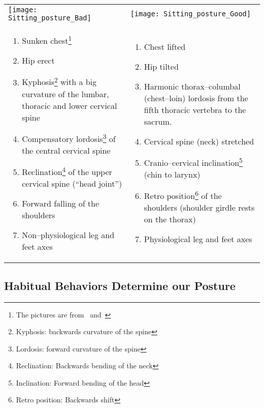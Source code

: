 \documentclass[../main.tex]{subfiles}
\begin{document}
\begin{minipage}{\textwidth}
\begin{tabular}{p{6.3cm}p{6.3cm}}
  \texttt{[image: Sitting\_posture\_Bad]} &

\texttt{[image: Sitting\_posture\_Good]} \\

  \begin{enumerate}
\item {Sunken chest}\footnote{The pictures are from~\cite{Haltung} and~\cite{Darmreinig}}
\item Hip erect
\item Kyphosis\footnote{Kyphosis: backwards curvature of the spine} with a big {curvature} of the lumbar, thoracic and lower cervical {spine}
\item Compensatory lordosis\footnote{Lordosis: forward curvature of the spine}
  of the central cervical spine
\item Reclination\footnote{Reclination: Backwards bending of the neck}
  of the upper cervical spine (``head joint'')
\item {Forward falling of the shoulders}
\item Non--physiological leg and feet axes
    \end{enumerate} &

  \begin{enumerate}
\item {Chest lifted}
\item Hip tilted
\item Harmonic thorax--columbal (chest--loin) {lordosis} from the fifth thoracic vertebra to the sacrum.
\item Cervical spine (neck) stretched
\item Cranio--cervical inclination\footnote{Inclination: Forward bending of the head} ({chin to larynx})
\item Retro position\footnote{Retro position: Backwards shift} of the shoulders ({shoulder girdle rests on the thorax})
\item Physiological leg and feet axes

    \end{enumerate}
\\
  
  \end{tabular}
\end{minipage}

\newpage
\subsection{Habitual Behaviors Determine our Posture}
\end{document}
